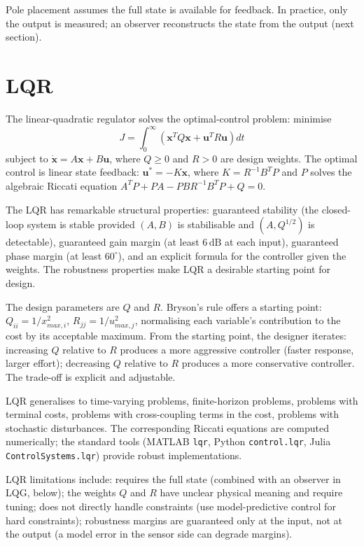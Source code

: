Pole placement assumes the full state is available for feedback. In practice, only the output is measured; an observer reconstructs the state from the output (next section).

\section{LQR}

The linear-quadratic regulator solves the optimal-control problem: minimise
$$J = \int_0^\infty (\mathbf{x}^T Q \mathbf{x} + \mathbf{u}^T R \mathbf{u}) dt$$
subject to $\dot{\mathbf{x}} = A \mathbf{x} + B \mathbf{u}$, where $Q \geq 0$ and $R > 0$ are design weights. The optimal control is linear state feedback: $\mathbf{u}^* = -K \mathbf{x}$, where $K = R^{-1} B^T P$ and $P$ solves the algebraic Riccati equation $A^T P + P A - P B R^{-1} B^T P + Q = 0$.

The LQR has remarkable structural properties: guaranteed stability (the closed-loop system is stable provided $(A, B)$ is stabilisable and $(A, Q^{1/2})$ is detectable), guaranteed gain margin (at least $6\,\text{dB}$ at each input), guaranteed phase margin (at least $60^\circ$), and an explicit formula for the controller given the weights. The robustness properties make LQR a desirable starting point for design.

The design parameters are $Q$ and $R$. Bryson's rule offers a starting point: $Q_{ii} = 1/x_{max,i}^2$, $R_{jj} = 1/u_{max,j}^2$, normalising each variable's contribution to the cost by its acceptable maximum. From the starting point, the designer iterates: increasing $Q$ relative to $R$ produces a more aggressive controller (faster response, larger effort); decreasing $Q$ relative to $R$ produces a more conservative controller. The trade-off is explicit and adjustable.

LQR generalises to time-varying problems, finite-horizon problems, problems with terminal costs, problems with cross-coupling terms in the cost, problems with stochastic disturbances. The corresponding Riccati equations are computed numerically; the standard tools (MATLAB \texttt{lqr}, Python \texttt{control.lqr}, Julia \texttt{ControlSystems.lqr}) provide robust implementations.

LQR limitations include: requires the full state (combined with an observer in LQG, below); the weights $Q$ and $R$ have unclear physical meaning and require tuning; does not directly handle constraints (use model-predictive control for hard constraints); robustness margins are guaranteed only at the input, not at the output (a model error in the sensor side can degrade margins).

